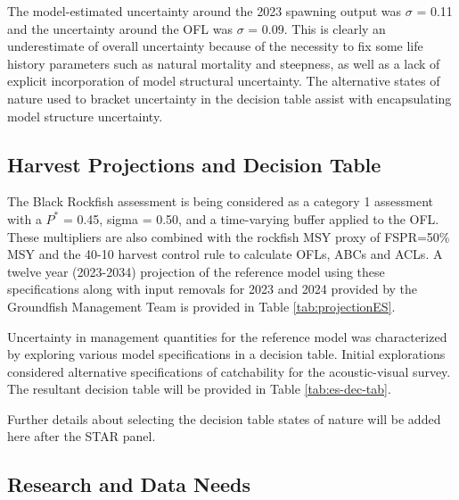 \documentclass[11pt,
  english,
  letterpaper,
]{article}
\begin{document}
The model-estimated uncertainty around the 2023 spawning output was \(\sigma\) = 0.11 and the uncertainty around the OFL was \(\sigma\) = 0.09. This is clearly an underestimate of overall uncertainty because of the necessity to fix some life history parameters such as natural mortality and steepness, as well as a lack of explicit incorporation of model structural uncertainty. The alternative states of nature used to bracket uncertainty in the decision table assist with encapsulating model structure uncertainty.

\hypertarget{harvest-projections-and-decision-table}{%
\subsection*{Harvest Projections and Decision Table}\label{harvest-projections-and-decision-table}}

The Black Rockfish assessment is being considered as a category 1 assessment with a \(P^*\) = 0.45, sigma = 0.50, and a time-varying buffer applied to the OFL. These multipliers are also combined with the rockfish MSY proxy of FSPR=50\% MSY and the 40-10 harvest control rule to calculate OFLs, ABCs and ACLs. A twelve year (2023-2034) projection of the reference model using these specifications along with input removals for 2023 and 2024 provided by the Groundfish Management Team is provided in Table \ref{tab:projectionES}.



Uncertainty in management quantities for the reference model was characterized by exploring various model specifications in a decision table. Initial explorations considered alternative specifications of catchability for the acoustic-visual survey. The resultant decision table will be provided in Table \ref{tab:es-dec-tab}.

Further details about selecting the decision table states of nature will be added here after the STAR panel.

\clearpage



\clearpage

\hypertarget{research-and-data-needs}{%
\subsection*{Research and Data Needs}\label{research-and-data-needs}}
\end{document}
